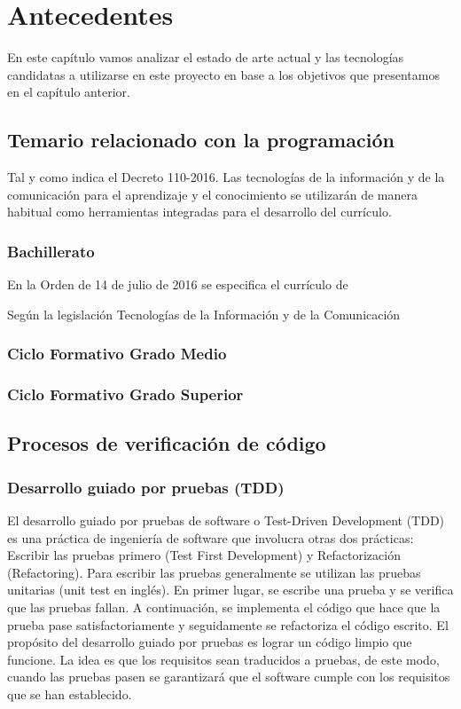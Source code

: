\chapter{Antecedentes}

En este capítulo vamos analizar el estado de arte actual y las tecnologías candidatas a utilizarse en este proyecto en base a los objetivos que presentamos en el capítulo anterior.


\section {Temario relacionado con la programación}

Tal y como indica el Decreto 110-2016. Las tecnologías de la información y de la comunicación para el aprendizaje y el conocimiento se
utilizarán de manera habitual como herramientas integradas para el desarrollo del currículo.

\subsection {Bachillerato}

En la Orden de 14 de julio de 2016 se especifica el currículo de

Según la legislación Tecnologías de la Información y de la Comunicación




\subsection {Ciclo Formativo Grado Medio}


\subsection {Ciclo Formativo Grado Superior}



\section {Procesos de verificación de código}

\subsection {Desarrollo guiado por pruebas (TDD)}

El desarrollo guiado por pruebas de software o Test-Driven Development (TDD) es una práctica de ingeniería de software que involucra otras dos prácticas: Escribir las pruebas primero (Test First Development) y Refactorización (Refactoring). Para escribir las pruebas generalmente se utilizan las pruebas unitarias (unit test en inglés). En primer lugar, se escribe una prueba y se verifica que las pruebas fallan. A continuación, se implementa el código que hace que la prueba pase satisfactoriamente y seguidamente se refactoriza el código escrito. El propósito del desarrollo guiado por pruebas es lograr un código limpio que funcione. La idea es que los requisitos sean traducidos a pruebas, de este modo, cuando las pruebas pasen se garantizará que el software cumple con los requisitos que se han establecido.

